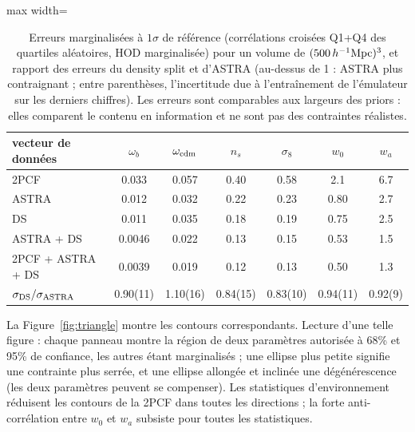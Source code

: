 \begin{table}[!htbp]
\centering\small
\begin{adjustbox}{max width=\linewidth}
\begin{tabular}{lcccccc}
\toprule
vecteur de données & $\omega_b$ & $\omega_{\rm cdm}$ & $n_s$ & $\sigma_8$ & $w_0$ & $w_a$ \\
\midrule
2PCF & 0.033 & 0.057 & 0.40 & 0.58 & 2.1 & 6.7 \\
ASTRA & 0.012 & 0.032 & 0.22 & 0.23 & 0.80 & 2.7 \\
DS & 0.011 & 0.035 & 0.18 & 0.19 & 0.75 & 2.5 \\
ASTRA + DS & 0.0046 & 0.022 & 0.13 & 0.15 & 0.53 & 1.5 \\
2PCF + ASTRA + DS & 0.0039 & 0.019 & 0.12 & 0.13 & 0.50 & 1.3 \\
\midrule
$\sigma_{\rm DS}/\sigma_{\rm ASTRA}$ & 0.90(11) & 1.10(16) & 0.84(15) & 0.83(10) & 0.94(11) & 0.92(9) \\
\bottomrule
\end{tabular}
\end{adjustbox}
\caption{Erreurs marginalisées à $1\sigma$ de référence (corrélations croisées Q1+Q4 des quartiles aléatoires, HOD marginalisée) pour un volume de $(500\,h^{-1}\mathrm{Mpc})^3$, et rapport des erreurs du density split et d'ASTRA (au-dessus de 1 : ASTRA plus contraignant ; entre parenthèses, l'incertitude due à l'entraînement de l'émulateur sur les derniers chiffres). Les erreurs sont comparables aux largeurs des priors : elles comparent le contenu en information et ne sont pas des contraintes réalistes.}
\label{tab:sigma}
\end{table}

La Figure~\ref{fig:triangle} montre les contours correspondants. Lecture d'une telle figure : chaque panneau montre la région de deux paramètres autorisée à 68\% et 95\% de confiance, les autres étant marginalisés ; une ellipse plus petite signifie une contrainte plus serrée, et une ellipse allongée et inclinée une dégénérescence (les deux paramètres peuvent se compenser). Les statistiques d'environnement réduisent les contours de la 2PCF dans toutes les directions ; la forte anti-corrélation entre $w_0$ et $w_a$ subsiste pour toutes les statistiques.

